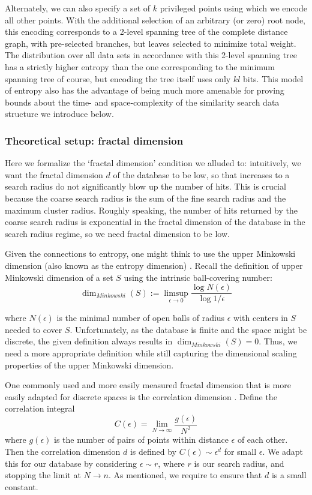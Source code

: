 \documentclass[review,preprint,12pt]{elsarticle}
\theoremstyle{definition}
\theoremstyle{remark}
\numberwithin{equation}{section}
\begin{document}
Alternately, we can also specify a set of $k$ privileged points using which we encode all other points.
With the additional selection of an arbitrary (or zero) root node, this encoding corresponds to a 2-level spanning tree of the complete distance graph, with pre-selected branches, but leaves selected to minimize total weight.
The distribution over all data sets in accordance with this 2-level spanning tree has a strictly higher entropy than the one corresponding to the minimum spanning tree of course, but encoding the tree itself uses only $kl$ bits.
This model of entropy also has the advantage of being much more amenable for proving bounds about the time- and space-complexity of the similarity search data structure we introduce below.

\subsubsection{Theoretical setup: fractal dimension}
Here we formalize the `fractal dimension' condition we alluded to: intuitively, we want the fractal dimension $d$ of the database to be low, so that increases to a search radius do not significantly blow up the number of hits.
This is crucial because the coarse search radius is the sum of the fine search radius and the maximum cluster radius.
Roughly speaking, the number of hits returned by the coarse search radius is exponential in the fractal dimension of the database in the search radius regime, so we need fractal dimension to be low.

Given the connections to entropy, one might think to use the upper Minkowski dimension (also known as the entropy dimension) \cite{falconer2013fractal}.
Recall the definition of upper Minkowski dimension of a set $S$ using the intrinsic ball-covering number:
\[
    \dim_{Minkowski}(S) := \limsup_{\epsilon \to 0} \frac{\log N(\epsilon)}{\log 1/\epsilon}
\]

where $N(\epsilon)$ is the minimal number of open balls of radius $\epsilon$ with centers in $S$ needed to cover $S$.
Unfortunately, as the database is finite and the space might be discrete, the given definition always results in $\dim_{Minkowski}(S) = 0$.
Thus, we need a more appropriate definition while still capturing the dimensional scaling properties of the upper Minkowski dimension.

One commonly used and more easily measured fractal dimension that is more easily adapted for discrete spaces is the correlation dimension \cite{grassberger1984dimensions}.
Define the correlation integral
\[
    C(\epsilon) = \lim_{N \to \infty} \frac{g(\epsilon)}{N^2}
\]
where $g(\epsilon)$ is the number of pairs of points within distance $\epsilon$ of each other.
Then the correlation dimension $d$ is defined by $C(\epsilon) \sim \epsilon^d$ for small $\epsilon$.
We adapt this for our database by considering $\epsilon \sim r$, where $r$ is our search radius, and stopping the limit at $N \to n$.
As mentioned, we require to ensure that $d$ is a small constant.
\end{document}
